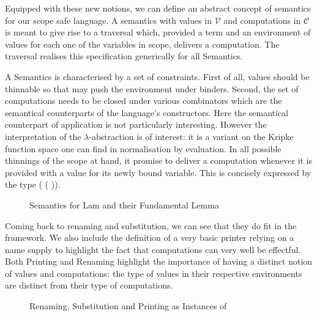 Equipped with these new notions, we can define an abstract
concept of semantics for our scope safe language. A semantics with
values in $\mathcal{V}$ and computations in $\mathcal{C}$ is meant
to give rise to a traversal which, provided a term and an environment
of values for each one of the variables in scope, delivers a computation.
The traversal  realises this specification generically for all
Semantics.

A Semantics is characterised by a set of constraints. First of all,
values should be thinnable so that  may push the environment
under binders. Second, the set of computations needs to be closed
under various combinators which are the semantical counterparts of
the language's constructors. Here the semantical counterpart of
application is not particularly interesting. However the interpretation
of the $\lambda$-abstraction is of interest: it is a variant on
the Kripke function space one can find in normalisation by evaluation.
In all possible thinnings of the scope at hand, it promise to deliver
a computation whenever it is provided with a value for its newly
bound variable. This is concisely expressed by the type
( (  )).

\begin{figure}[h]
\begin{minipage}{0.45\textwidth}
\end{minipage}\hspace{2em}
\begin{minipage}{0.45\textwidth}
\end{minipage}
\caption{Semantics for Lam and their Fundamental Lemma}
\end{figure}

Coming back to renaming and substitution, we can see that they do fit
in the  framework. We also include the definition of a very
basic printer relying on a name supply to highlight the fact that
computations can very well be effectful. Both Printing and Renaming
highlight the importance of having a distinct notion of values and
computations: the type of values in their respective environments
are distinct from their type of computations.

\begin{figure}[h]
\begin{minipage}{0.40\textwidth}
\end{minipage}\hspace{1em}
\begin{minipage}{0.50\textwidth}
\end{minipage}
\caption{Renaming, Substitution and Printing as Instances of }
\end{figure}

